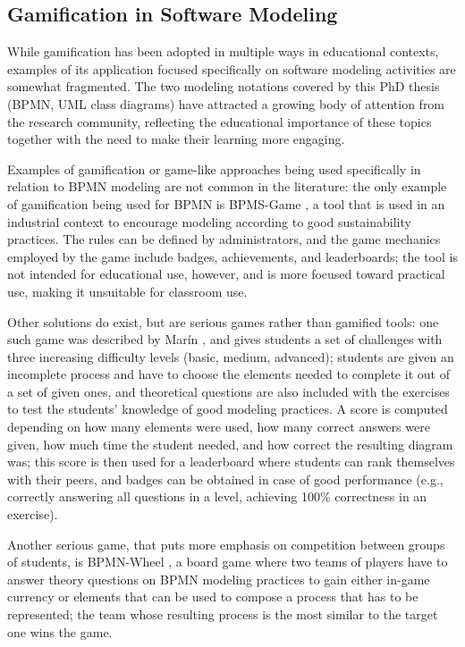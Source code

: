 \subsection{Gamification in Software Modeling}
\label{sec:back_gamif_mde}

While gamification has been adopted in multiple ways in educational contexts, examples of its application focused specifically on software modeling activities are somewhat fragmented. The two modeling notations covered by this PhD thesis (BPMN, UML class diagrams) have attracted a growing body of attention from the research community, reflecting the educational importance of these topics together with the need to make their learning more engaging.

Examples of gamification or game-like approaches being used specifically in relation to BPMN modeling are not common in the literature: the only example of gamification being used for BPMN is BPMS-Game \cite{mancebo_bpms-game_2017}, a tool that is used in an industrial context to encourage modeling according to good sustainability practices. The rules can be defined by administrators, and the game mechanics employed by the game include badges, achievements, and leaderboards; the tool is not intended for educational use, however, and is more focused toward practical use, making it unsuitable for classroom use.

Other solutions do exist, but are serious games rather than gamified tools: one such game was described by Marín \cite{marin_lessons_2022}, and gives students a set of challenges with three increasing difficulty levels (basic, medium, advanced); students are given an incomplete process and have to choose the elements needed to complete it out of a set of given ones, and theoretical questions are also included with the exercises to test the students' knowledge of good modeling practices. A score is computed depending on how many elements were used, how many correct answers were given, how much time the student needed, and how correct the resulting diagram was; this score is then used for a leaderboard where students can rank themselves with their peers, and badges can be obtained in case of good performance (e.g., correctly answering all questions in a level, achieving 100\% correctness in an exercise).

Another serious game, that puts more emphasis on competition between groups of students, is BPMN-Wheel \cite{kutun_bpmn_2019}, a board game where two teams of players have to answer theory questions on BPMN modeling practices to gain either in-game currency or elements that can be used to compose a process that has to be represented; the team whose resulting process is the most similar to the target one wins the game.

